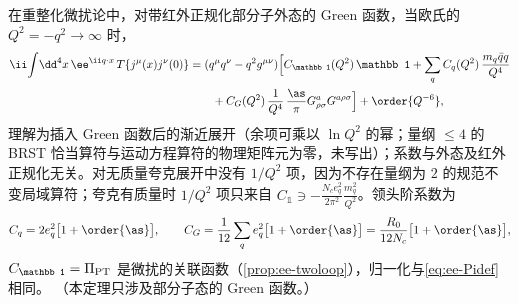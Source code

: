 \begin{theorem}\label{thm:ee-ope}
在重整化微扰论中，对带红外正规化部分子外态的 Green 函数，当欧氏的 $Q^2=-q^2\to\infty$ 时，
\begin{equation}\label{eq:ee-ope}
\begin{split}
\ii\!\int\!\dd^4x\,\ee^{\ii q\cdot x}\,T\{j^\mu(x)j^\nu(0)\}&=(q^\mu q^\nu-q^2g^{\mu\nu})\Big[C_{\mathbb 1}(Q^2)\,\mathbb 1+\sum_qC_q(Q^2)\,\frac{m_q\bar qq}{Q^4}\\
&\qquad+C_G(Q^2)\,\frac{1}{Q^4}\,\frac{\as}\pi G^a_{\rho\sigma}G^{a\rho\sigma}\Big]+\order{Q^{-6}},
\end{split}
\end{equation}
理解为插入 Green 函数后的渐近展开（余项可乘以 $\ln Q^2$ 的幂；量纲 $\le4$ 的 BRST 恰当算符与运动方程算符的物理矩阵元为零，未写出）；系数与外态及红外正规化无关。对无质量夸克展开中没有 $1/Q^2$ 项，因为不存在量纲为 $2$ 的规范不变局域算符；夸克有质量时 $1/Q^2$ 项只来自 $C_{\mathbb 1}\ni-\frac{N_ce_q^2}{2\pi^2}\frac{m_q^2}{Q^2}$。领头阶系数为
\begin{equation}\label{eq:ee-ope-coeff}
C_q=2e_q^2\big[1+\order{\as}\big],\qquad C_G=\frac1{12}\sum_qe_q^2\big[1+\order{\as}\big]=\frac{R_0}{12N_c}\big[1+\order{\as}\big],
\end{equation}
$C_{\mathbb 1}=\Pi_{\rm PT}$ 是微扰的关联函数（\cref{prop:ee-twoloop}），归一化与\cref{eq:ee-Pidef}相同。%
（本定理只涉及部分子态的 Green 函数。）
\end{theorem}
